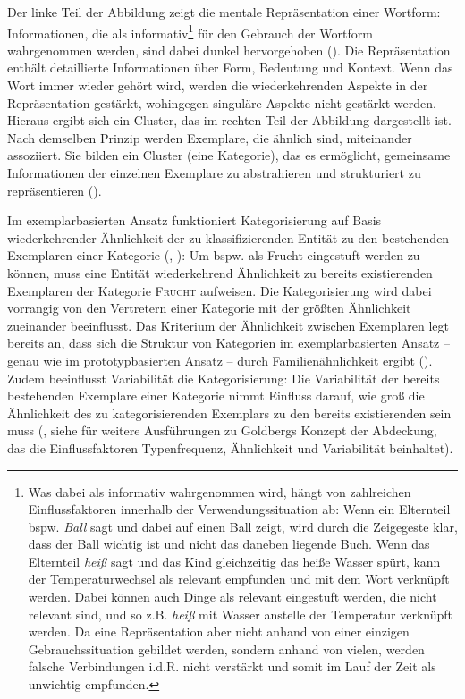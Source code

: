 Der linke Teil der Abbildung zeigt die mentale Repräsentation einer Wortform: Informationen, die als informativ{\footnote{Was dabei als informativ wahrgenommen wird, hängt von zahlreichen Einflussfaktoren innerhalb der Verwendungssituation ab: Wenn ein Elternteil bspw. \textit{Ball} sagt und dabei auf einen Ball zeigt, wird durch die Zeigegeste klar, dass der Ball wichtig ist und nicht das daneben liegende Buch. Wenn das Elternteil \textit{heiß} sagt und das Kind gleichzeitig das heiße Wasser spürt, kann der Temperaturwechsel als relevant empfunden und mit dem Wort verknüpft werden. Dabei können auch Dinge als relevant eingestuft werden, die nicht relevant sind, und so z.B. \textit{heiß} mit Wasser anstelle der Temperatur verknüpft werden. Da eine Repräsentation aber nicht anhand von einer einzigen Gebrauchssituation gebildet werden, sondern anhand von vielen, werden falsche Verbindungen i.d.R. nicht verstärkt und somit im Lauf der Zeit als unwichtig empfunden.}} für den Gebrauch der Wortform wahrgenommen werden, sind dabei dunkel hervorgehoben (\cite[16]{Goldberg.2019}). Die Repräsentation enthält detaillierte Informationen über Form, Bedeutung und Kontext. Wenn das Wort immer wieder gehört wird, werden die wiederkehrenden Aspekte in der Repräsentation gestärkt, wohingegen singuläre Aspekte nicht gestärkt werden. Hieraus ergibt sich ein Cluster, das im rechten Teil der Abbildung dargestellt ist. Nach demselben Prinzip werden Exemplare, die ähnlich sind, miteinander assoziiert. Sie bilden ein Cluster (eine Kategorie), das es ermöglicht, gemeinsame Informationen der einzelnen Exemplare zu abstrahieren und strukturiert zu repräsentieren (\cite[54]{Bybee.2013}). 



Im exemplarbasierten Ansatz funktioniert Kategorisierung auf Basis wiederkehrender Ähnlichkeit der zu klassifizierenden Entität zu den bestehenden Exemplaren einer Kategorie (\cite[212--213]{Ross.1999}, \cite[51--52]{Goldberg.2019}): Um bspw. als Frucht eingestuft werden zu können, muss eine Entität wiederkehrend Ähnlichkeit zu bereits existierenden Exemplaren der Kategorie \textsc{Frucht} aufweisen. Die Kategorisierung wird dabei vorrangig von den Vertretern einer Kategorie mit der größten Ähnlichkeit zueinander beeinflusst. Das Kriterium der Ähnlichkeit zwischen Exemplaren legt bereits an, dass sich die Struktur von Kategorien im exemplarbasierten Ansatz -- genau wie  im prototypbasierten Ansatz -- durch Familienähnlichkeit ergibt (\cite[327]{Bybee.2006}). Zudem beeinflusst Variabilität die Kategorisierung:  Die Variabilität der bereits bestehenden Exemplare einer Kategorie nimmt Einfluss darauf, wie groß die Ähnlichkeit des zu kategorisierenden Exemplars zu den bereits existierenden sein muss (\cite[62--64]{Goldberg.2019}, siehe  für weitere Ausführungen zu Goldbergs Konzept der Abdeckung, das die Einflussfaktoren Typenfrequenz, Ähnlichkeit und Variabilität beinhaltet).\largerpage

